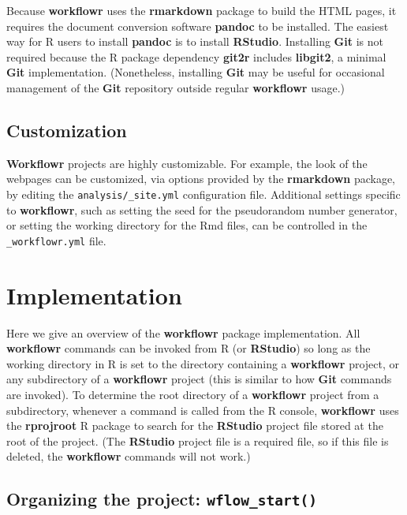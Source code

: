 \documentclass[9pt,a4paper]{extarticle}
\begin{document}
Because \textbf{workflowr} uses the \textbf{rmarkdown} package to build the HTML pages, it
requires the document conversion software \textbf{pandoc} to be installed. The
easiest way for R users to install \textbf{pandoc} is to install \textbf{RStudio}.
Installing \textbf{Git} is not required because the R package dependency \textbf{git2r}
includes \textbf{libgit2}, a minimal \textbf{Git} implementation. (Nonetheless, installing
 \textbf{Git} may be useful for occasional management of the \textbf{Git} repository
outside regular \textbf{workflowr} usage.)

\subsection*{Customization}

 \textbf{Workflowr} projects are highly customizable. For example, the look of the
webpages can be customized, via options provided by the \textbf{rmarkdown}
package, by editing the \texttt{analysis/\_site.yml} configuration file.
Additional settings specific to \textbf{workflowr}, such as setting the seed for
the pseudorandom number generator, or setting the working directory for
the Rmd files, can be controlled in the \texttt{\_workflowr.yml} file.


\section*{Implementation}

Here we give an overview of the \textbf{workflowr} package implementation. All \textbf{workflowr} commands can be invoked from R (or \textbf{RStudio}) so long as the working directory in R is set to the directory containing a \textbf{workflowr} project, or any subdirectory of a \textbf{workflowr} project (this is similar to how \textbf{Git} commands are invoked). To determine the root directory of a \textbf{workflowr} project from a subdirectory, whenever a command is called from the R console, \textbf{workflowr} uses the \textbf{rprojroot} \cite{rprojroot} R package to search for the \textbf{RStudio} project file stored at the root of the project. (The \textbf{RStudio} project file is a required file, so if this file is deleted, the \textbf{workflowr} commands will not work.)

\subsection*{Organizing the project: \texttt{wflow\_start()}}
\end{document}

